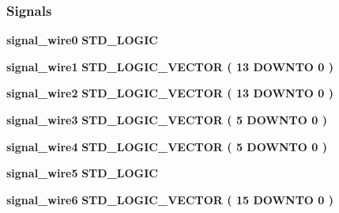 \subsubsection*{Signals}
 \begin{DoxyCompactItemize}
\item 
{\bf signal\+\_\+wire0} {\bfseries \textcolor{comment}{S\+T\+D\+\_\+\+L\+O\+G\+IC}\textcolor{vhdlchar}{ }} 
\item 
{\bf signal\+\_\+wire1} {\bfseries \textcolor{comment}{S\+T\+D\+\_\+\+L\+O\+G\+I\+C\+\_\+\+V\+E\+C\+T\+OR}\textcolor{vhdlchar}{ }\textcolor{vhdlchar}{(}\textcolor{vhdlchar}{ }\textcolor{vhdlchar}{ } \textcolor{vhdldigit}{13} \textcolor{vhdlchar}{ }\textcolor{keywordflow}{D\+O\+W\+N\+TO}\textcolor{vhdlchar}{ }\textcolor{vhdlchar}{ } \textcolor{vhdldigit}{0} \textcolor{vhdlchar}{ }\textcolor{vhdlchar}{)}\textcolor{vhdlchar}{ }} 
\item 
{\bf signal\+\_\+wire2} {\bfseries \textcolor{comment}{S\+T\+D\+\_\+\+L\+O\+G\+I\+C\+\_\+\+V\+E\+C\+T\+OR}\textcolor{vhdlchar}{ }\textcolor{vhdlchar}{(}\textcolor{vhdlchar}{ }\textcolor{vhdlchar}{ } \textcolor{vhdldigit}{13} \textcolor{vhdlchar}{ }\textcolor{keywordflow}{D\+O\+W\+N\+TO}\textcolor{vhdlchar}{ }\textcolor{vhdlchar}{ } \textcolor{vhdldigit}{0} \textcolor{vhdlchar}{ }\textcolor{vhdlchar}{)}\textcolor{vhdlchar}{ }} 
\item 
{\bf signal\+\_\+wire3} {\bfseries \textcolor{comment}{S\+T\+D\+\_\+\+L\+O\+G\+I\+C\+\_\+\+V\+E\+C\+T\+OR}\textcolor{vhdlchar}{ }\textcolor{vhdlchar}{(}\textcolor{vhdlchar}{ }\textcolor{vhdlchar}{ } \textcolor{vhdldigit}{5} \textcolor{vhdlchar}{ }\textcolor{keywordflow}{D\+O\+W\+N\+TO}\textcolor{vhdlchar}{ }\textcolor{vhdlchar}{ } \textcolor{vhdldigit}{0} \textcolor{vhdlchar}{ }\textcolor{vhdlchar}{)}\textcolor{vhdlchar}{ }} 
\item 
{\bf signal\+\_\+wire4} {\bfseries \textcolor{comment}{S\+T\+D\+\_\+\+L\+O\+G\+I\+C\+\_\+\+V\+E\+C\+T\+OR}\textcolor{vhdlchar}{ }\textcolor{vhdlchar}{(}\textcolor{vhdlchar}{ }\textcolor{vhdlchar}{ } \textcolor{vhdldigit}{5} \textcolor{vhdlchar}{ }\textcolor{keywordflow}{D\+O\+W\+N\+TO}\textcolor{vhdlchar}{ }\textcolor{vhdlchar}{ } \textcolor{vhdldigit}{0} \textcolor{vhdlchar}{ }\textcolor{vhdlchar}{)}\textcolor{vhdlchar}{ }} 
\item 
{\bf signal\+\_\+wire5} {\bfseries \textcolor{comment}{S\+T\+D\+\_\+\+L\+O\+G\+IC}\textcolor{vhdlchar}{ }} 
\item 
{\bf signal\+\_\+wire6} {\bfseries \textcolor{comment}{S\+T\+D\+\_\+\+L\+O\+G\+I\+C\+\_\+\+V\+E\+C\+T\+OR}\textcolor{vhdlchar}{ }\textcolor{vhdlchar}{(}\textcolor{vhdlchar}{ }\textcolor{vhdlchar}{ } \textcolor{vhdldigit}{15} \textcolor{vhdlchar}{ }\textcolor{keywordflow}{D\+O\+W\+N\+TO}\textcolor{vhdlchar}{ }\textcolor{vhdlchar}{ } \textcolor{vhdldigit}{0} \textcolor{vhdlchar}{ }\textcolor{vhdlchar}{)}\textcolor{vhdlchar}{ }} 

\end{DoxyCompactItemize}
